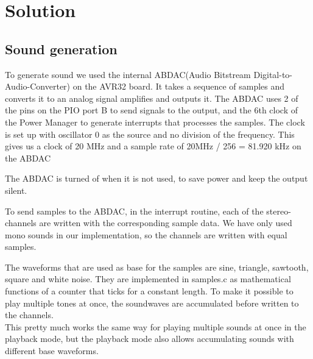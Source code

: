 \section{Solution}
\subsection{Sound generation}
To generate sound we used the internal ABDAC(Audio Bitstream Digital-to-Audio-Converter) on the AVR32 board. It takes a sequence of samples and converts it to an analog signal amplifies and outputs it.
The ABDAC uses 2 of the pins on the PIO port B to send signals to the output, and the 6th clock of the Power Manager to generate interrupts that processes the samples. The clock is set up with oscillator 0 as the source and no division of the frequency. This gives us a clock of 20 MHz and a sample rate of 20MHz / 256 = 81.920 kHz on the ABDAC\\

The ABDAC is turned of when it is not used, to save power and keep the output silent.\\

To send samples to the ABDAC, in the interrupt routine, each of the stereo-channels are written with the corresponding sample data. We have only used mono sounds in our implementation, so the channels are written with equal samples.\\

The waveforms that are used as base for the samples are sine, triangle, sawtooth, square and white noise. They are implemented in samples.c as mathematical functions of a counter that ticks for a constant length. To make it possible to play multiple tones at once, the soundwaves are accumulated before written to the channels.\\
This pretty much works the same way for playing multiple sounds at once in the playback mode, but the playback mode also allows accumulating sounds with different base waveforms.\\

